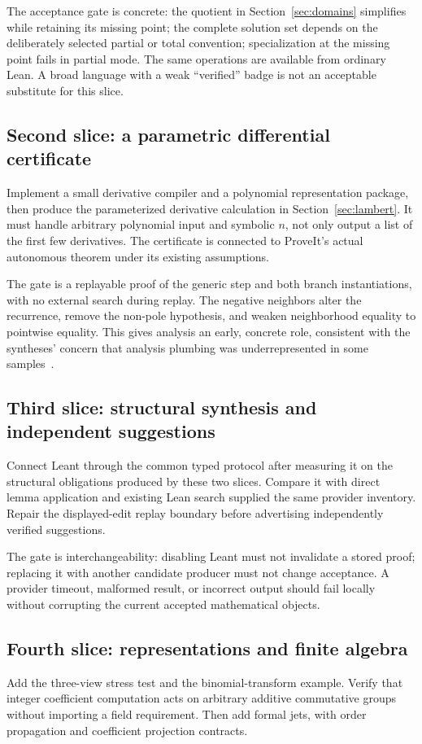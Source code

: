 \documentclass[11pt,a4paper]{article}
\theoremstyle{remark}
\begin{document}
The acceptance gate is concrete: the quotient in Section~\ref{sec:domains}
simplifies while retaining its missing point; the complete solution set depends
on the deliberately selected partial or total convention; specialization at the
missing point fails in partial mode. The same operations are available from
ordinary Lean. A broad language with a weak ``verified'' badge is not an
acceptable substitute for this slice.

\subsection{Second slice: a parametric differential certificate}
Implement a small derivative compiler and a polynomial representation package,
then produce the parameterized derivative calculation in
Section~\ref{sec:lambert}. It must handle arbitrary polynomial input and symbolic
$n$, not only output a list of the first few derivatives. The certificate is
connected to ProveIt's actual autonomous theorem under its existing assumptions.

The gate is a replayable proof of the generic step and both branch
instantiations, with no external search during replay. The negative neighbors
alter the recurrence, remove the non-pole hypothesis, and weaken neighborhood
equality to pointwise equality. This gives analysis an early, concrete role,
consistent with the syntheses' concern that analysis plumbing was underrepresented
in some samples~\cite{synA,synB}.

\subsection{Third slice: structural synthesis and independent suggestions}
Connect Leant through the common typed protocol after measuring it on the
structural obligations produced by these two slices. Compare it with direct
lemma application and existing Lean search supplied the same provider inventory.
Repair the displayed-edit replay boundary before advertising independently
verified suggestions.

The gate is interchangeability: disabling Leant must not invalidate a stored
proof; replacing it with another candidate producer must not change acceptance.
A provider timeout, malformed result, or incorrect output should fail locally
without corrupting the current accepted mathematical objects.

\subsection{Fourth slice: representations and finite algebra}
Add the three-view stress test and the binomial-transform example. Verify that
integer coefficient computation acts on arbitrary additive commutative groups
without importing a field requirement. Then add formal jets, with order
propagation and coefficient projection contracts.
\end{document}
